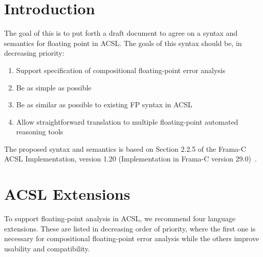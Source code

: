 \section{Introduction}\label{sec:fpintro}

The goal of this is to put forth a draft document to agree on a syntax and semantics for floating point in ACSL. The goals of this syntax should be, in decreasing priority:

\begin{enumerate}
	\item Support specification of compositional floating-point error analysis
	\item Be as simple as possible
	\item Be as similar as possible to existing FP syntax in ACSL
	\item Allow straightforward translation to multiple floating-point automated reasoning tools
\end{enumerate}

The proposed syntax and semantics is based on Section 2.2.5 of the Frama-C ACSL
Implementation, version 1.20 (Implementation in Frama-C version 29.0)~\cite{cea:2024:acsl}.

\section{ACSL Extensions}

To support floating-point analysis in ACSL, we recommend four language extensions. These are listed in decreasing order of priority, where the first one is necessary for compositional floating-point error analysis while the others improve usability and compatibility.


